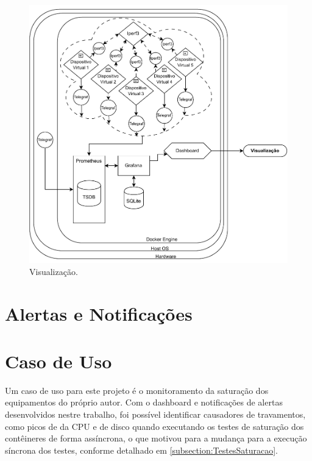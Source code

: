 \begin{figure}[ht]
\centering
\setlength{\abovecaptionskip}{-20pt}
\includegraphics[width=\textwidth]{Imagens/chap04/by-blocks/dashboard_diagram.pdf}
\caption{Visualização.}
\label{fig:DiagramaVisualizacao}
\end{figure}



\section{Alertas e Notificações}
\label{section:Alertas}


\section{Caso de Uso}
\label{section:CasosDeUso}

Um caso de uso para este projeto é o monitoramento da saturação dos equipamentos do próprio autor. Com o dashboard e notificações de alertas desenvolvidos nestre trabalho, foi possível identificar causadores de travamentos, como picos de  da CPU e  de disco quando executando os testes de saturação dos contêineres de forma assíncrona, o que motivou para a mudança para a execução síncrona dos testes, conforme detalhado em \ref{subsection:TestesSaturacao}.

